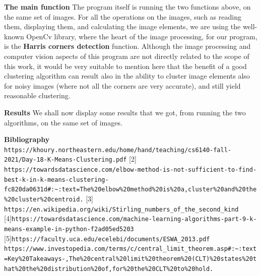 \documentclass[12pt]{article}
\begin{document}
\textbf{The main function} \newline
The program itself is running the two functions above, on the same set of images. \newline
For all the operations on the images, such as reading them, displaying them, and calculating the image elements, we are using the well-known OpenCv library,
where the heart of the image processing, for our program, is the \textbf{Harris corners detection} function. \newline
Although the image processing and computer vision aspects of this program are not directly related to the scope of this work, it would be very suitable to mention here that the benefit of a good clustering algorithm can result also in the ability to cluster image elements also for noisy images (where not all the corners are very accurate), and still yield reasonable clustering.

\textbf{Results}
We shall now display some results that we got, from running the two algorithms, on the same set of images. \newline

\newpage
\textbf{Bibliography} \newline
[1] \verb|https://khoury.northeastern.edu/home/hand/teaching/cs6140-fall-2021/Day-18-K-Means-Clustering.pdf|
[2] \verb|https://towardsdatascience.com/elbow-method-is-not-sufficient-to-find-best-k-in-k-means-clustering-fc820da0631d#:~:text=The%20elbow%20method%20is%20a,cluster%20and%20the%20cluster%20centroid.|
[3] \verb|https://en.wikipedia.org/wiki/Stirling_numbers_of_the_second_kind|
[4]\verb|https://towardsdatascience.com/machine-learning-algorithms-part-9-k-means-example-in-python-f2ad05ed5203|
[5]\verb|https://faculty.uca.edu/ecelebi/documents/ESWA_2013.pdf| \newline
[6]\verb|https://www.investopedia.com/terms/c/central_limit_theorem.asp#:~:text=Key%20Takeaways-,The%20central%20limit%20theorem%20(CLT)%20states%20that%20the%20distribution%20of,for%20the%20CLT%20to%20hold.|
\end{document}
